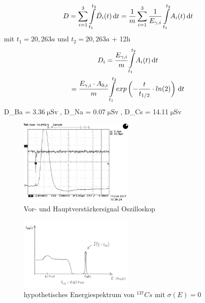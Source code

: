 \documentclass[aps,twocolumn,secnumarabic,nobalancelastpage,amsmath,amssymb,
nofootinbib,superscriptaddress]{revtex4-1}
\begin{document}
\section{ }

\begin{equation}
  D = \sum\limits_{i=1}^3 \int\limits_{t_1}^{t_2} \! \dot{D_i}(t) \, \mathrm{d}t = \frac{1}{m}\sum\limits_{i=1}^3
  \frac{1}{E_{\gamma,i}} \int\limits_{t_1}^{t_2} \! A_{i}(t) \, \mathrm{d}t  \newline
\end{equation}
mit $t_1 = 20,263a$ und $t_2 = 20,263a$ + 12h
\begin{equation}
  \begin{gathered}
    D_i = \cfrac{E_{\gamma,i}}{m} \int\limits_{t_1}^{t_2} \! A_i(t) \, \mathrm{d}t \\
    = \cfrac{E_{\gamma,i}\cdot A_{0,i}}{m} \int\limits_{t_1}^{t_2} \! exp\left(-\frac{t}{t_{1/2}}\cdot ln(2)\right) \, \mathrm{d}t
  \end{gathered}
\end{equation}
\Rightarrow D_{Ba} = 3.36\:$\upmu\text{Sv}$,\: D_{Na} = 0.07\:$\upmu\text{Sv}$,\: D_{Cs} = 14.11\:$\upmu\text{Sv}$
\vspace{3em}

\begin{figure}[h]
  \centering
  \includegraphics[width=0.5\textwidth]{../Messung/OsziVerstaerkerkurve/TEK00009.jpg}
  \caption{\label{fig:aufbau} Vor- und Hauptverstärkersignal Oszilloskop}
\end{figure}

\begin{figure}[h]
  \centering
  \includegraphics[width=0.5\textwidth]{../Messung/deltaspektrum.jpg}
  \caption{\label{fig:deltaspek} hypothetisches Energiespektrum von $^{137}Cs$ mit $\sigma(E)=0$}
\end{figure}
\end{document}
